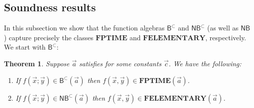 \documentclass[manuscript,screen]{acmart}
\newtheorem{thm}{Theorem}
\theoremstyle{definition}
\theoremstyle{remark}
\newcommand{\permpref}{\subset}
\newcommand{\ptime}{\mathbf{PTIME}}
\newcommand{\pspace}{\mathbf{PSPACE}}
\newcommand{\elementary}{\mathbf{ELEMENTARY}}
\newcommand{\f}{\mathbf{F}}
\newcommand{\fptime}{\f\ptime}
\newcommand{\fpspace}{\f\pspace}
\newcommand{\felementary}{\f\elementary}
\newcommand{\sumlen}[1]{|\hspace{-.15em}|#1|\hspace{-.15em}|}
\newcommand{\bc}{\mathsf{B}}
\newcommand{\bcwfpo}[1]{\bc^{#1}}
\newcommand{\nested}{\mathsf{N}}
\newcommand{\nbc}{\nested\bc}
\newcommand{\nbcwfpo}[1]{\nested\bcwfpo{#1}}
\newcommand{\shallow}{\mathsf{S}}
\newcommand{\sbc}{\shallow\bc}
\newcommand{\sbcwfpo}[1]{\sbc^{#1}}
\newcommand{\bcpp}{\bcwfpo{\permpref}}
\newcommand{\nbcpp}{\nbcwfpo{\permpref}}
\newcommand{\sbcpp}{\sbcwfpo\permpref}
\begin{document}

\subsection{Soundness results}
In this subsection we  show that the function algebras $\bcpp$ and $\nbcpp$ (as well as $\nbc$)  capture precisely the classes  $\fptime$ and $\felementary$, respectively. We start with $\bcpp$:

\begin{thm}
\label{thm:fp-soundness}
Suppose $\vec a$ satisfies  for some constants $\vec c$.
We have the following:
\begin{enumerate}
    \item\label{item:soundness-fp} If $f(\vec x;\vec y) \in \bcpp (\vec a)$ then $f(\vec x,\vec y) \in \fptime(\vec a)$.
    \item\label{item:soundness-felementary} If $f(\vec x;\vec y) \in \nbcpp (\vec a)$ then $f(\vec x,\vec y) \in \felementary(\vec a)$.
\end{enumerate}
\end{thm}
\end{document}
